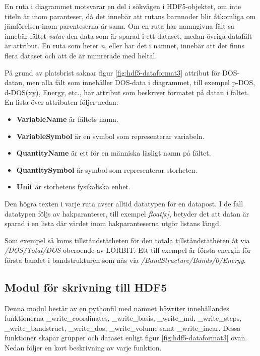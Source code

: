 \documentclass[a4paper,12pt]{article}
\begin{document}
En ruta i diagrammet motsvarar en del i sökvägen i HDF5-objektet, om inte titeln är inom paranteser, då det innebär att rutans barnnoder blir åtkomliga om jämförelsen inom parenteserna är sann. Om en ruta har namngivna fält så innebär fältet \emph{value} den data som är sparad i ett dataset, medan övriga
datafält är attribut. En ruta som heter \emph{n}, eller har det i namnet, innebär att det finns flera dataset och att de är numrerade med heltal.

På grund av platsbrist saknar figur \ref{fig:hdf5-dataformat3} attribut för DOS-datan, men alla fält som innehåller DOS-data i diagrammet, till exempel p-DOS, d-DOS(xy), Energy, etc., har attribut som beskriver formatet på datan i fältet. En lista över attributen följer nedan:

\begin{itemize}
    \item \textbf{VariableName} är fältets namn.
    \item \textbf{VariableSymbol} är en symbol som representerar variabeln.
    \item \textbf{QuantityName} är ett för en människa läsligt namn på fältet.
    \item \textbf{QuantitySymbol} är symbol som representerar storheten.
    \item \textbf{Unit} är storhetens fysikaliska enhet.
\end{itemize}

Den högra texten i varje ruta avser alltid datatypen för en datapost. I de fall datatypen följs av hakparanteser, till exempel \emph{float[x]}, betyder det att datan är sparad i en lista där värdet inom hakparanteserna utgör listans längd.

Som exempel så koms tillståndstätheten för den totala
tillståndstätheten åt via \emph{/DOS/Total/DOS} oberoende av LORBIT. Ett till exempel är första energin för första bandet i bandstrukturen som nås via \emph{/BandStructure/Bands/0/Energy}.

\subsection{Modul för skrivning till HDF5}
Denna modul består av en pythonfil med namnet h5writer innehållandes funktionerna \_write\_coordinates, \_write\_basis, \_write\_md, \_write\_steps, \_write\_bandstruct, \_write\_dos, \_write\_volume samt \_write\_incar. Dessa funktioner skapar grupper och dataset enligt figur \ref{fig:hdf5-dataformat3} ovan. Nedan följer en kort beskrivning av varje funktion.
\end{document}
